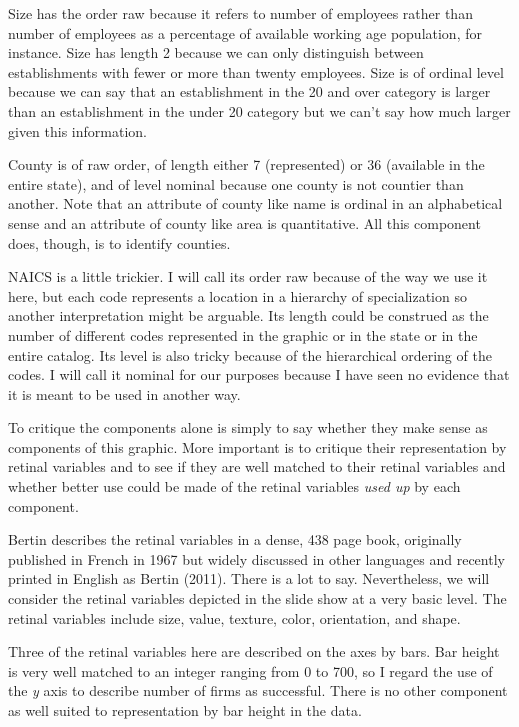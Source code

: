 Size has the order raw because it refers to number of employees rather
than number of employees as a percentage of available working age
population, for instance. Size has length 2 because we can only
distinguish between establishments with fewer or more than twenty
employees. Size is of ordinal level because we can say that an
establishment in the 20 and over category is larger than an
establishment in the under 20 category but we can't say how much larger
given this information.

County is of raw order, of length either 7 (represented) or 36
(available in the entire state), and of level nominal because one county
is not countier than another. Note that an attribute of county like name
is ordinal in an alphabetical sense and an attribute of county like area
is quantitative. All this component does, though, is to identify
counties.

NAICS is a little trickier. I will call its order raw because of the way
we use it here, but each code represents a location in a hierarchy of
specialization so another interpretation might be arguable. Its length
could be construed as the number of different codes represented in the
graphic or in the state or in the entire catalog. Its level is also
tricky because of the hierarchical ordering of the codes. I will call it
nominal for our purposes because I have seen no evidence that it is
meant to be used in another way.

To critique the components alone is simply to say whether they make
sense as components of this graphic. More important is to critique their
representation by retinal variables and to see if they are well matched
to their retinal variables and whether better use could be made of the
retinal variables \emph{used up} by each component.

\hypertarget{retinal-variables}{%
\label{retinal-variables}}

Bertin describes the retinal variables in a dense, 438 page book,
originally published in French in 1967 but widely discussed in other
languages and recently printed in English as Bertin (2011). There is a
lot to say. Nevertheless, we will consider the retinal variables
depicted in the slide show at a very basic level. The retinal variables
include size, value, texture, color, orientation, and shape.

Three of the retinal variables here are described on the axes by bars.
Bar height is very well matched to an integer ranging from 0 to 700, so
I regard the use of the \emph{y} axis to describe number of firms as
successful. There is no other component as well suited to representation
by bar height in the data.

